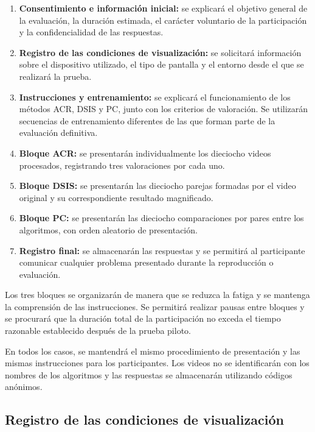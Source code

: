 \begin{enumerate}
\item \textbf{Consentimiento e información inicial:} se explicará el objetivo general de la evaluación, la duración estimada, el carácter voluntario de la participación y la confidencialidad de las respuestas.

\item \textbf{Registro de las condiciones de visualización:} se solicitará información sobre el dispositivo utilizado, el tipo de pantalla y el entorno desde el que se realizará la prueba.

\item \textbf{Instrucciones y entrenamiento:} se explicará el funcionamiento de los métodos ACR, DSIS y PC, junto con los criterios de valoración. Se utilizarán secuencias de entrenamiento diferentes de las que forman parte de la evaluación definitiva.

\item \textbf{Bloque ACR:} se presentarán individualmente los dieciocho videos procesados, registrando tres valoraciones por cada uno.

\item \textbf{Bloque DSIS:} se presentarán las dieciocho parejas formadas por el video original y su correspondiente resultado magnificado.

\item \textbf{Bloque PC:} se presentarán las dieciocho comparaciones por pares entre los algoritmos, con orden aleatorio de presentación.

\item \textbf{Registro final:} se almacenarán las respuestas y se permitirá al participante comunicar cualquier problema presentado durante la reproducción o evaluación.

\end{enumerate}

Los tres bloques se organizarán de manera que se reduzca la fatiga y se mantenga la comprensión de las instrucciones. Se permitirá realizar pausas entre bloques y se procurará que la duración total de la participación no exceda el tiempo razonable establecido después de la prueba piloto.

En todos los casos, se mantendrá el mismo procedimiento de presentación y las mismas instrucciones para los participantes. Los videos no se identificarán con los nombres de los algoritmos y las respuestas se almacenarán utilizando códigos anónimos.

\subsection{Registro de las condiciones de visualización}

